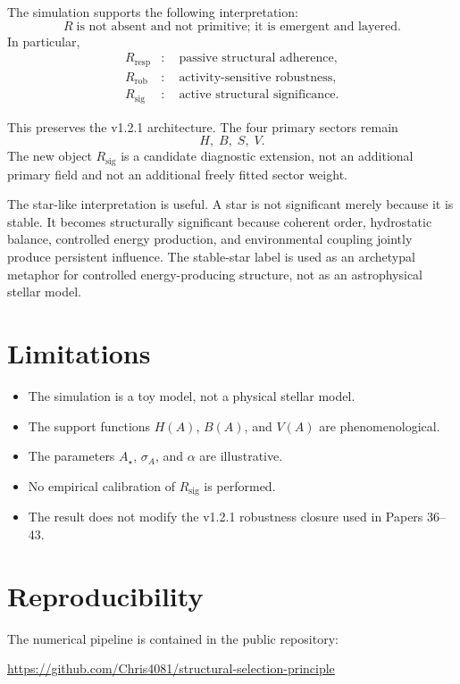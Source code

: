 \documentclass[11pt,a4paper]{article}
\newcommand{\Rresp}{R_{\mathrm{resp}}}
\newcommand{\Rrob}{R_{\mathrm{rob}}}
\newcommand{\Rsig}{R_{\mathrm{sig}}}
\begin{document}
The simulation supports the following interpretation:
\[
\boxed{
R\;\text{is not absent and not primitive; it is emergent and layered.}
}
\]
In particular,
\begin{align}
\Rresp &:\quad \text{passive structural adherence},\\
\Rrob  &:\quad \text{activity-sensitive robustness},\\
\Rsig  &:\quad \text{active structural significance}.
\end{align}

This preserves the v1.2.1 architecture.
The four primary sectors remain
\[
H,\;B,\;S,\;V.
\]
The new object $\Rsig$ is a candidate diagnostic extension, not an additional
primary field and not an additional freely fitted sector weight.

The star-like interpretation is useful.
A star is not significant merely because it is stable.
It becomes structurally significant because coherent order, hydrostatic
balance, controlled energy production, and environmental coupling jointly
produce persistent influence.
The stable-star label is used as an archetypal metaphor for controlled
energy-producing structure, not as an astrophysical stellar model.

\section{Limitations}

\begin{itemize}[leftmargin=1.5em]
\item The simulation is a toy model, not a physical stellar model.
\item The support functions $H(A)$, $B(A)$, and $V(A)$ are phenomenological.
\item The parameters $A_\star$, $\sigma_A$, and $\alpha$ are illustrative.
\item No empirical calibration of $\Rsig$ is performed.
\item The result does not modify the v1.2.1 robustness closure used in
Papers 36--43.
\end{itemize}

\section{Reproducibility}

The numerical pipeline is contained in the public repository:
\begin{center}
\url{https://github.com/Chris4081/structural-selection-principle}
\end{center}
\end{document}
